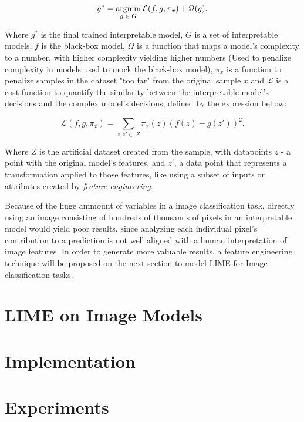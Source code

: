 \begin{equation}
    g^* = \operatorname*{argmin}_{g \;\in\; G} \mathcal{L}(f, g, \pi_x) + \Omega(g).
    \label{eq:lime_optimization}  
\end{equation}

Where \(g^*\) is the final trained interpretable model, 
\(G\) is a set of interpretable models, \(f\) is the black-box model, 
\(\Omega\) is a function that maps a model's complexity to a number, with higher complexity yielding higher numbers (Used to penalize complexity in models used to mock the black-box model),
\(\pi_x\) is a function to penalize samples in the dataset "too far" from the original sample \(x\) and
\(\mathcal{L}\) is a cost function to quantify the similarity between the interpretable model's decisions and the complex model's decisions, defined by the expression bellow:

\begin{equation}
    \mathcal{L}(f, g, \pi_x) = \sum_{z, z' \in \; Z} \pi_x(z) (f(z) - g(z'))^2.
    \label{eq:lime_loss}  
\end{equation}

Where \(Z\) is the artificial dataset created from the sample, with datapoints \(z\) - a point with the original model's features, and \(z'\), a data point that represents a transformation applied to those features, like using a subset of inputs or attributes created by \emph{feature engineering}.

Because of the huge ammount of variables in a image classification task, directly using an image consisting of hundreds of thousands of pixels in an interpretable model would yield poor results, since analyzing each individual pixel's contribution to a prediction is not well aligned with a human interpretation of image features.
In order to generate more valuable results, a feature engineering technique will be proposed on the next section to model LIME for Image classification tasks. 

\section{LIME on Image Models}

\section{Implementation}


\section{Experiments} 